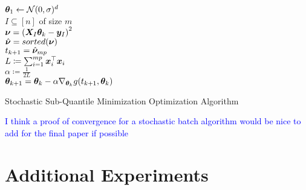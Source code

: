 \documentclass{article} %
\begin{document}
\begin{appendices}
\begin{algorithm}[H]
		${\bm{\theta}}_1 \gets \mathcal{N}(0,\sigma)^d$\\
		{
			$I \subseteq \left[n\right]$ of size $m$\\
			$\displaystyle {\bm{\nu}} = \left({\bm{X}}_I{\bm{\theta}}_k - {\bm{y}}_I\right)^2$\\
			$\hat{{\bm{\nu}}} = sorted({\bm{\nu}})$\\
			$\displaystyle t_{k+1} = \hat{{\bm{\nu}}}_{mp}$\\
			$L \coloneqq \sum_{i=1}^{mp} {\bm{x}}_i^\top{\bm{x}}_i$\\
			$\alpha \coloneqq \frac{1}{2L}$\\
			$\displaystyle {\bm{\theta}}_{k+1} = {\bm{\theta}}_k - \alpha \nabla_{{\bm{\theta}}_k}g(t_{k+1},{\bm{\theta}}_k)$
		}
		\caption{Stochastic Sub-Quantile Minimization Optimization Algorithm}
		\label{alg:sqo-stochastic}
	\end{algorithm}
	\textcolor{blue}{I think a proof of convergence for a stochastic batch algorithm would be nice to add for the final paper if possible}
	
	\newpage
	
	\section{Additional Experiments}
	\label{app:additional-experiments}

\end{appendices}
\end{document}
